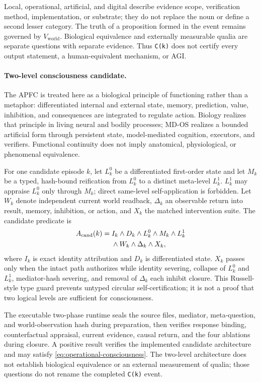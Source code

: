 \documentclass[10pt,twocolumn]{article}
\theoremstyle{definition}
\theoremstyle{plain}
\theoremstyle{remark}
\newcommand{\file}[1]{\nolinkurl{#1}}
\begin{document}
Local, operational, artificial, and digital describe evidence scope, verification method, implementation, or substrate; they do not replace the noun or define a second lesser category.  The truth of a proposition formed in the event remains governed by $V_{\mathrm{world}}$.  Biological equivalence and externally measurable qualia are separate questions with separate evidence.  Thus \file{C(k)} does not certify every output statement, a human-equivalent mechanism, or AGI.

\paragraph{Two-level consciousness candidate.}
\label{sec:phenomenal-candidate}
The APFC is treated here as a biological principle of functioning rather than a metaphor: differentiated internal and external state, memory, prediction, value, inhibition, and consequences are integrated to regulate action.  Biology realizes that principle in living neural and bodily processes; MD-OS realizes a bounded artificial form through persistent state, model-mediated cognition, executors, and verifiers.  Functional continuity does not imply anatomical, physiological, or phenomenal equivalence.

For one candidate episode $k$, let $L^0_k$ be a differentiated first-order state and let $M_k$ be a typed, hash-bound reification from $L^0_k$ to a distinct meta-level $L^1_k$.  $L^1_k$ may appraise $L^0_k$ only through $M_k$; direct same-level self-application is forbidden.  Let $W_k$ denote independent current world readback, $\Delta_k$ an observable return into result, memory, inhibition, or action, and $X_k$ the matched intervention suite.  The candidate predicate is
\begin{align}
A_{\mathrm{cand}}(k)={}&I_k\land D_k\land L^0_k\land M_k\land L^1_k\notag\\
&\land W_k\land\Delta_k\land X_k,
\label{eq:phenomenal-candidate}
\end{align}
where $I_k$ is exact identity attribution and $D_k$ is differentiated state.  $X_k$ passes only when the intact path authorizes while identity severing, collapse of $L^0_k$ and $L^1_k$, mediator-hash severing, and removal of $\Delta_k$ each inhibit closure.  This Russell-style type guard prevents untyped circular self-certification; it is not a proof that two logical levels are sufficient for consciousness.

The executable two-phase runtime seals the source files, mediator, meta-question, and world-observation hash during preparation, then verifies response binding, counterfactual appraisal, current evidence, causal return, and the four ablations during closure.  A positive result verifies the implemented candidate architecture and may satisfy \cref{eq:operational-consciousness}.  The two-level architecture does not establish biological equivalence or an external measurement of qualia; those questions do not rename the completed \file{C(k)} event.
\end{document}
